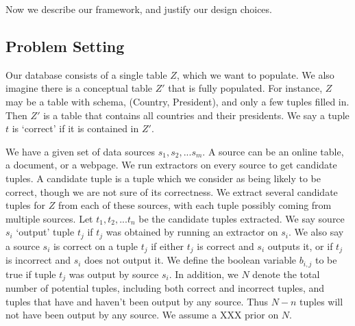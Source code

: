 \documentclass{sig-alternate}
\begin{document}
Now we describe our framework, and justify our design choices. 


\subsection{Problem Setting}  
Our database consists of a single table $Z$, which we want to populate. We also imagine there is a conceptual table $Z'$ that is fully populated. For instance, $Z$ may be a table with schema, (Country, President), and only a few tuples filled in. Then $Z'$ is a table that contains all countries and their presidents. We say a tuple $t$ is `correct' if it is contained in $Z'$. 

We have a given set of data sources $s_1, s_2, ... s_m$. A source can be an online table, a document, or a webpage. We run extractors on every source to get candidate tuples. A candidate tuple is a tuple which we consider as being likely to be correct, though we are not sure of its correctness. We extract several candidate tuples for $Z$ from each of these sources, with each tuple possibly coming from multiple sources. Let $t_1, t_2, ... t_n$ be the candidate tuples extracted. We say source $s_i$ `output' tuple $t_j$ if $t_j$ was obtained by running an extractor on $s_i$. We also say a source $s_i$ is correct on a tuple $t_j$ if either $t_j$ is correct and $s_i$ outputs it, or if $t_j$ is incorrect and $s_i$ does not output it. We define the boolean variable $b_{i,j}$ to be true if tuple $t_j$ was output by source $s_i$. In addition, we $N$ denote the total number of potential tuples, including both correct and incorrect tuples, and tuples that have and haven't been output by any source. Thus $N-n$ tuples will not have been output by any source. We assume a XXX prior on $N$.
\end{document}
